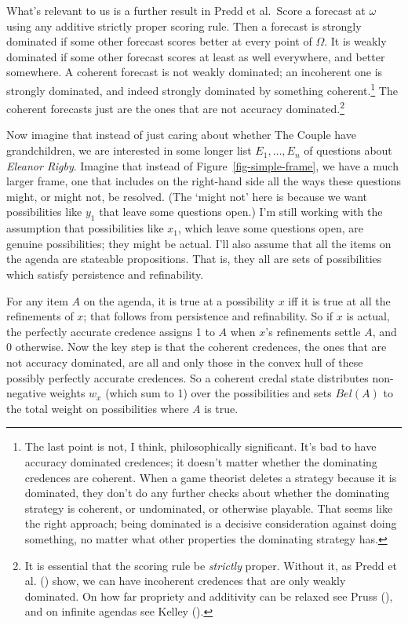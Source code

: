 \documentclass[
  11pt,
  letterpaper,
  DIV=11,
  numbers=noendperiod,
  twoside]{scrartcl}
\begin{document}
What's relevant to us is a further result in Predd et al.~Score a
forecast at \(\omega\) using any additive strictly proper scoring rule.
Then a forecast is strongly dominated if some other forecast scores
better at every point of \(\Omega\). It is weakly dominated if some
other forecast scores at least as well everywhere, and better somewhere.
A coherent forecast is not weakly dominated; an incoherent one is
strongly dominated, and indeed strongly dominated by something
coherent.\footnote{The last point is not, I think, philosophically
  significant. It's bad to have accuracy dominated credences; it doesn't
  matter whether the dominating credences are coherent. When a game
  theorist deletes a strategy because it is dominated, they don't do any
  further checks about whether the dominating strategy is coherent, or
  undominated, or otherwise playable. That seems like the right
  approach; being dominated is a decisive consideration against doing
  something, no matter what other properties the dominating strategy
  has.} The coherent forecasts just are the ones that are not accuracy
dominated.\footnote{It is essential that the scoring rule be
  \emph{strictly} proper. Without it, as Predd et al.
  () show, we can have incoherent
  credences that are only weakly dominated. On how far propriety and
  additivity can be relaxed see Pruss (),
  and on infinite agendas see Kelley ().}

Now imagine that instead of just caring about whether The Couple have
grandchildren, we are interested in some longer list \(E_1, \dots, E_n\)
of questions about \emph{Eleanor Rigby}. Imagine that instead of
Figure~\ref{fig-simple-frame}, we have a much larger frame, one that
includes on the right-hand side all the ways these questions might, or
might not, be resolved. (The `might not' here is because we want
possibilities like \(y_1\) that leave some questions open.) I'm still
working with the assumption that possibilities like \(x_1\), which leave
some questions open, are genuine possibilities; they might be actual.
I'll also assume that all the items on the agenda are stateable
propositions. That is, they all are sets of possibilities which satisfy
persistence and refinability.

For any item \(A\) on the agenda, it is true at a possibility \(x\) iff
it is true at all the refinements of \(x\); that follows from
persistence and refinability. So if \(x\) is actual, the perfectly
accurate credence assigns 1 to \(A\) when \(x\)'s refinements settle
\(A\), and 0 otherwise. Now the key step is that the coherent credences,
the ones that are not accuracy dominated, are all and only those in the
convex hull of these possibly perfectly accurate credences. So a
coherent credal state distributes non-negative weights \(w_x\) (which
sum to 1) over the possibilities and sets \(Bel(A)\) to the total weight
on possibilities where \(A\) is true.
\end{document}
